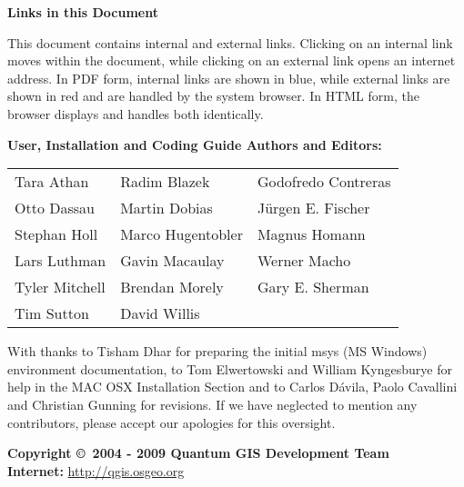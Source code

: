 \textbf{Links in this Document}

This document contains internal and external links.  Clicking on an
internal link moves within the document, while clicking on an external link
opens an internet address.  In PDF form, internal links are shown in blue,
while external links are shown in red and are handled by the
system browser. In HTML form, the browser displays and handles both
identically. 

\begin{flushleft}
\textbf{User, Installation and Coding Guide Authors and Editors:}
 
\begin{tabular}{p{5cm} p{5cm} p{5cm}}
Tara Athan & Radim Blazek & Godofredo Contreras \\
Otto Dassau & Martin Dobias & J\"urgen E. Fischer \\ 
Stephan Holl & Marco Hugentobler & Magnus Homann \\ 
Lars Luthman & Gavin Macaulay & Werner Macho \\
Tyler Mitchell & Brendan Morely & Gary E. Sherman \\ 
Tim Sutton & David Willis &  \\
\end{tabular}


With thanks to Tisham Dhar for preparing the initial msys (MS Windows)
environment documentation, to Tom Elwertowski and William Kyngesburye for
help in the MAC OSX Installation Section and to Carlos D\'{a}vila, Paolo
Cavallini and Christian Gunning for revisions. If we have neglected to 
mention any contributors, please accept our apologies for this oversight.

\textbf{Copyright \copyright~2004 - 2009 Quantum GIS Development Team} \\
\textbf{Internet:} \url{http://qgis.osgeo.org}
\end{flushleft}

